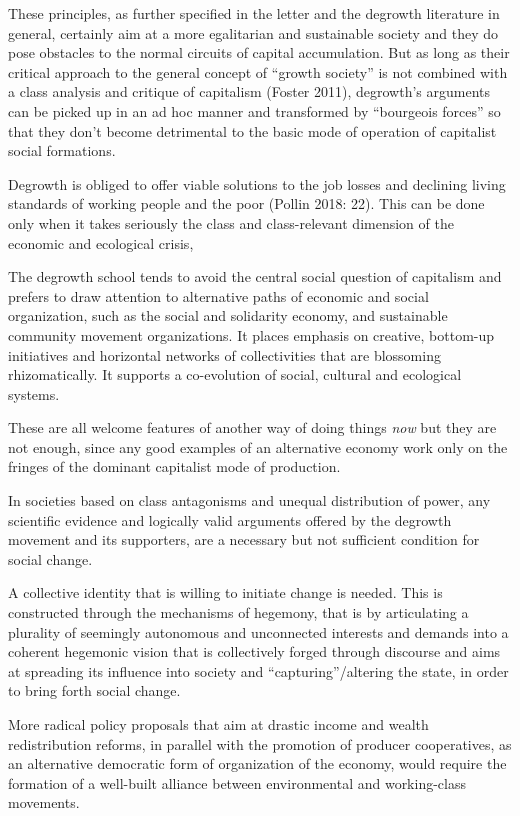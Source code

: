 \documentclass[
]{book}
\begin{document}
These principles, as further specified in the letter and the degrowth literature in general, certainly aim at a more
egalitarian and sustainable society and they do pose obstacles to the normal circuits of capital accumulation.
But as long as their critical approach to the general concept of ``growth society'' is not combined with a class
analysis and critique of capitalism (Foster 2011), degrowth's arguments can be picked up in an ad hoc manner
and transformed by ``bourgeois forces'' so that they don't become detrimental to the basic mode of operation of
capitalist social formations.

Degrowth is obliged to offer viable solutions to the job losses and declining living standards of working
people and the poor (Pollin 2018: 22). This can be done only when it takes seriously the class and class-relevant
dimension of the economic and ecological crisis,

The degrowth school tends to avoid the central social question of capitalism and prefers to
draw attention to alternative paths of economic and social organization, such as the social and solidarity
economy, and sustainable community movement organizations.
It places emphasis
on creative, bottom-up initiatives and horizontal networks of collectivities that are blossoming rhizomatically.
It supports a co-evolution of social, cultural and ecological systems.

These are all welcome features of another way of doing things \emph{now}
but they are not enough, since any good
examples of an alternative economy work only on the fringes of the dominant capitalist mode of production.

In societies based on class antagonisms and unequal distribution of power, any scientific evidence and
logically valid arguments offered by the degrowth movement and its supporters, are a necessary but not
sufficient condition for social change.

A collective identity that is willing to initiate change is needed. This is
constructed through the mechanisms of hegemony, that is by
articulating a plurality of seemingly autonomous and unconnected interests and demands into a coherent
hegemonic vision that is collectively forged through discourse and aims at spreading its influence into society
and ``capturing''/altering the state, in order to bring forth social change.

More radical policy proposals that aim at drastic income and wealth
redistribution reforms, in parallel with the promotion of producer cooperatives, as an alternative democratic
form of organization of the economy, would require the formation of a well-built alliance between
environmental and working-class movements.
\end{document}
